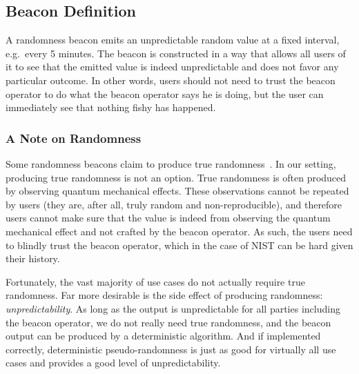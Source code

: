 


\subsection{Beacon Definition}

A randomness beacon emits an unpredictable random value at a fixed interval, e.g.\ every 5 minutes.
The beacon is constructed in a way that allows all users of it to see that the emitted value is indeed unpredictable and does not favor any particular outcome.
In other words, users should not need to trust the beacon operator to do what the beacon operator says he is doing, but the user can immediately see that nothing fishy has happened.

\subsubsection{A Note on Randomness}
Some randomness beacons claim to produce true randomness~\cite{nistbeacon}.
In our setting, producing true randomness is not an option.
True randomness is often produced by observing quantum mechanical effects.
These observations cannot be repeated by users (they are, after all, truly random and non-reproducible), and therefore users cannot make sure that the value is indeed from observing the quantum mechanical effect and not crafted by the beacon operator.
As such, the users need to blindly trust the beacon operator, which in the case of NIST can be hard given their history\cite{nytimes-nsabackdoors, nytimes-nsaconstants, nist2014backdoor}.

Fortunately, the vast majority of use cases do not actually require true randomness.
Far more desirable is the side effect of producing randomness: \emph{unpredictability}.
As long as the output is unpredictable for all parties including the beacon operator, we do not really need true randomness, and the beacon output can be produced by a deterministic algorithm.
And if implemented correctly, deterministic pseudo-randomness is just as good for virtually all use cases and provides a good level of unpredictability.

